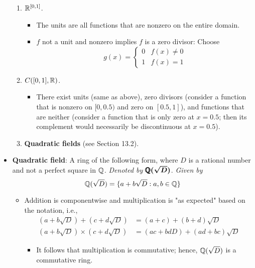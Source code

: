 \documentclass[../notes.tex]{subfiles}
\begin{document}
\begin{itemize}
\begin{enumerate}
        \item $\mathbb{R}^{[0,1]}$.
        \begin{itemize}
            \item The units are all functions that are nonzero on the entire domain.
            \item $f$ not a unit and nonzero implies $f$ is a zero divisor: Choose
            \begin{equation*}
                g(x) =
                \begin{cases}
                    0 & f(x)\neq 0\\
                    1 & f(x)=1
                \end{cases}
            \end{equation*}
        \end{itemize}
        \item $C([0,1],\mathbb{R})$.
        \begin{itemize}
            \item There exist units (same as above), zero divisors (consider a function that is nonzero on $[0,0.5)$ and zero on $[0.5,1]$), and functions that are neither (consider a function that is only zero at $x=0.5$; then its complement would necessarily be discontinuous at $x=0.5$).
        \end{itemize}
        \item \textbf{Quadratic fields} (see Section 13.2).
    \end{enumerate}
    \item \textbf{Quadratic field}: A ring of the following form, where $D$ is a rational number and not a perfect square in $\mathbb{Q}$. \emph{Denoted by} $\bm{\pmb{\mathbb{Q}}(\sqrt{D})}$. \emph{Given by}
    \begin{equation*}
        \mathbb{Q}(\sqrt{D}) = \{a+b\sqrt{D}:a,b\in\mathbb{Q}\}
    \end{equation*}
    \begin{itemize}
        \item Addition is componentwise and multiplication is "as expected" based on the notation, i.e.,
        \begin{align*}
            (a+b\sqrt{D})+(c+d\sqrt{D}) &= (a+c)+(b+d)\sqrt{D}\\
            (a+b\sqrt{D})\times(c+d\sqrt{D}) &= (ac+bdD)+(ad+bc)\sqrt{D}
        \end{align*}
        \begin{itemize}
            \item It follows that multiplication is commutative; hence, $\mathbb{Q}(\sqrt{D})$ is a commutative ring.

\end{itemize}
\end{itemize}
\end{itemize}
\end{document}

